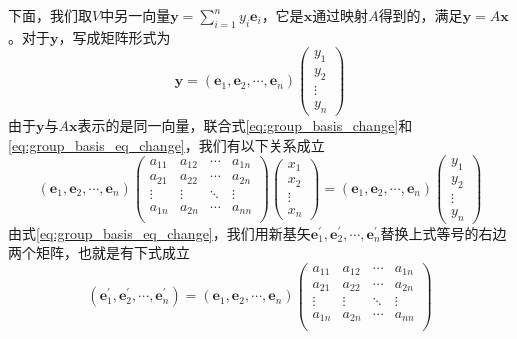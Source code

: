 下面，我们取$V$中另一向量$\bm{y} = \sum_{i=1}^{n}y_i\bm{e}_i$，它是$\bm{x}$通过映射$A$得到的，满足$\bm{y} = A\bm{x}$。对于$\bm{y}$，写成矩阵形式为
\begin{equation}
	\bm{y} = (\bm{e}_1, \bm{e}_2, \cdots, \bm{e}_n)
				\begin{pmatrix}
					y_1	\\
					y_2	\\
					\vdots	\\
					y_n
				\end{pmatrix}	\label{eq:group_basis_eq_change}
\end{equation} 
由于$\bm{y}$与$A\bm{x}$表示的是同一向量，联合式\eqref{eq:group_basis_change}和\eqref{eq:group_basis_eq_change}，我们有以下关系成立
\begin{equation}
	 (\bm{e}_1, \bm{e}_2, \cdots, \bm{e}_n)
		\begin{pmatrix}
			a_{11}	&	a_{12}	&	\cdots	&	a_{1n}	\\
			a_{21}	&	a_{22}	&	\cdots	&	a_{2n}	\\
			\vdots	&	\vdots	&	\ddots	&	\vdots	\\
			a_{1n}	&	a_{2n}	&	\cdots	&	a_{nn}	\\
		\end{pmatrix}
		\begin{pmatrix}
			x_1	\\
			x_2	\\
			\vdots	\\
			x_n
		\end{pmatrix}
		=
		(\bm{e}_1, \bm{e}_2, \cdots, \bm{e}_n)
		\begin{pmatrix}
			y_1	\\
			y_2	\\
			\vdots	\\
			y_n
		\end{pmatrix}
\end{equation} 
由式\eqref{eq:group_basis_eq_change}，我们用新基矢$\bm{e}^{\prime}_1, \bm{e}^{\prime}_2, \cdots, \bm{e}^{\prime}_n$替换上式等号的右边两个矩阵，也就是有下式成立
\begin{equation}
	(\bm{e}^{\prime}_1, \bm{e}^{\prime}_2, \cdots, \bm{e}^{\prime}_n )
	=
	(\bm{e}_1, \bm{e}_2, \cdots, \bm{e}_n)
	\begin{pmatrix}
		a_{11}	&	a_{12}	&	\cdots	&	a_{1n}	\\
		a_{21}	&	a_{22}	&	\cdots	&	a_{2n}	\\
		\vdots	&	\vdots	&	\ddots	&	\vdots	\\
		a_{1n}	&	a_{2n}	&	\cdots	&	a_{nn}	\\
	\end{pmatrix}
\end{equation} 

